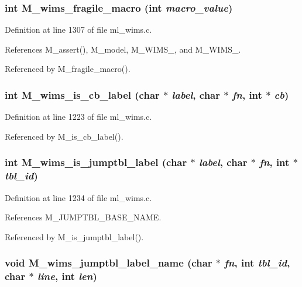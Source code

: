 \subsubsection{\setlength{\rightskip}{0pt plus 5cm}int M\_\-wims\_\-fragile\_\-macro (int {\em macro\_\-value})}\label{ml__wims_8c_6ad7dec34a11d248caed4379d0475929}




Definition at line 1307 of file ml\_\-wims.c.

References M\_\-assert(), M\_\-model, M\_\-WIMS\_, and M\_\-WIMS\_.

Referenced by M\_\-fragile\_\-macro().
\subsubsection{\setlength{\rightskip}{0pt plus 5cm}int M\_\-wims\_\-is\_\-cb\_\-label (char $\ast$ {\em label}, char $\ast$ {\em fn}, int $\ast$ {\em cb})}\label{ml__wims_8c_0da47fd5c010bd6a99c9ff439c9f52e7}




Definition at line 1223 of file ml\_\-wims.c.

Referenced by M\_\-is\_\-cb\_\-label().
\subsubsection{\setlength{\rightskip}{0pt plus 5cm}int M\_\-wims\_\-is\_\-jumptbl\_\-label (char $\ast$ {\em label}, char $\ast$ {\em fn}, int $\ast$ {\em tbl\_\-id})}\label{ml__wims_8c_fabc9fa87765b3760076768f573c5724}




Definition at line 1234 of file ml\_\-wims.c.

References M\_\-JUMPTBL\_\-BASE\_\-NAME.

Referenced by M\_\-is\_\-jumptbl\_\-label().
\subsubsection{\setlength{\rightskip}{0pt plus 5cm}void M\_\-wims\_\-jumptbl\_\-label\_\-name (char $\ast$ {\em fn}, int {\em tbl\_\-id}, char $\ast$ {\em line}, int {\em len})}\label{ml__wims_8c_2aee614b4f83be73ddbbab47e7632e3d}




